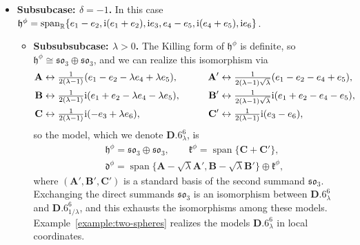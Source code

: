 \documentclass[pdftex]{sigma}
\newlength{\caseIndent}
\DeclareMathOperator{\spanOperator}{span}
\newcommand{\bbR}{\mathbb{R}}
\newcommand{\mbA}{\mathbf{A}}
\newcommand{\mbB}{\mathbf{B}}
\newcommand{\mbC}{\mathbf{C}}
\newcommand{\mfd} {\mathfrak{d}}
\newcommand{\mfh} {\mathfrak{h}}
\newcommand{\mfk} {\mathfrak{k}}
\newcommand{\mfso} {\mathfrak{so}}
\numberwithin{equation}{section}
\begin{document}
\begin{itemize}[leftmargin=\caseIndent]
\begin{itemize}[leftmargin=\caseIndent]
	\item[] \textbf{Subsubcase: $\delta = -1$.} In this case $\mfh^{\phi} = \spanOperator_{\bbR}\{ e_1 - e_2, {\rm i} (e_1 + e_2), {\rm i} e_3, e_4 - e_5, {\rm i} (e_4 + e_5), {\rm i} e_6 \}$.
		\begin{itemize}[leftmargin=\caseIndent]\itemsep=0pt
			\item[] \textbf{Subsubsubcase: $\lambda > 0$.} The Killing form of $\mfh^{\phi}$ is definite, so $\mfh^{\phi} \cong \mfso_3 \oplus \mfso_3$, and we can realize this isomorphism via
		\begin{alignat*}{4}
			\mbA
				& \leftrightarrow \tfrac{1}{2 (\lambda - 1)} (e_1 - e_2 - \lambda e_4 + \lambda e_5) , \qquad &
			\mbA'
				&\leftrightarrow \tfrac{1}{2 (\lambda - 1) \sqrt{\lambda}} (e_1 - e_2 - e_4 + e_5) , \\
			\mbB
				&\leftrightarrow \tfrac{1}{2 (\lambda - 1)} {\rm i} (e_1 + e_2 - \lambda e_4 - \lambda e_5) , \qquad &
			\mbB'
				&\leftrightarrow \tfrac{1}{2 (\lambda - 1) \sqrt{\lambda}} {\rm i} (e_1 + e_2 - e_4 - e_5) , \\
			\mbC
				&\leftrightarrow \tfrac{1}{2 (\lambda - 1)} {\rm i} (-e_3 + \lambda e_6 ) , \qquad &
			\mbC'
				&\leftrightarrow \tfrac{1}{2 (\lambda - 1)} {\rm i} (e_3 - e_6) ,
		\end{alignat*}
		so the model, which we denote $\mathbf{D.6}_{\lambda}^6$, is
		\begin{equation*}
			\boxed{
 \begin{split}
 &\mfh^{\phi} = \mfso_3 \oplus \mfso_3 , \qquad
	 	 \mfk^{\phi} = \operatorname{span}\big\{\mbC + \mbC'\big\} , \\
 &\mfd^{\phi} = \operatorname{span}\big\{\mbA - \sqrt{\lambda} \mbA', \mbB - \sqrt{\lambda} \mbB'\big\} \oplus \mfk^{\phi} ,
 \end{split}
			}
		\end{equation*}
		where $(\mbA', \mbB', \mbC')$ is a standard basis of the second summand $\mfso_3$. Exchanging the direct summands $\mfso_3$ is an isomorphism between $\mathbf{D.6}_{\lambda}^6$ and $\mathbf{D.6}_{1 / \lambda}^6$, and this exhausts the isomorphisms among these models. Example~\ref{example:two-spheres} realizes the models $\mathbf{D.6}_{\lambda}^6$ in local coordinates.


\end{itemize}
\end{itemize}
\end{itemize}
\end{document}
